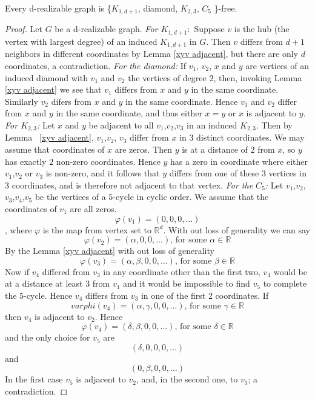 \documentclass[12pt,a4paper,titlepage,openany]{report}
\begin{document}
\begin{theorem}\label{d-realizable-free}
Every d-realizable graph is \{$K_{1,d+1}$, diamond,
$K_{2,3}$, $C_5$ \}-free.
\end{theorem} 
\begin{proof} Let $G$ be a d-realizable graph.\newline
\textit{For $K_{1,d+1}:$} Suppose $v$ is the hub (the vertex with largest degree) of an induced $K_{1,d+1}$ in $G$. Then $v$ differs from $d+1$ neighbors in different coordinates by Lemma \ref{xyv adjacent}, but there are only $d$ coordinates, a contradiction.\newline
\textit{For the diamond:} If $v_1$, $v_2$, $x$ and $y$ are vertices of an induced diamond with $v_1$ and $v_2$ the vertices of degree $2$, then, invoking Lemma \ref{xyv adjacent} we see that $v_1$ differs from $x$ and $y$ in the same coordinate. Similarly $v_2$ difers from $x$ and $y$ in the same coordinate. Hence $v_1$ and $v_2$ differ from $x$ and $y$ in the same coordinate, and thus either $x=y$ or $x$ is adjacent to $y$.\newline
\textit{For $K_{2,3}$:} Let $x$ and $y$ be adjacent to all $v_1$,$v_2$,$v_3$ in an induced $K_{2,3}$. Then by Lemma ~\ref{xyv adjacent}, $v_1$,$v_2$, $v_3$ differ from $x$ in $3$ distinct coordinates. We may assume that coordinates of $x$ are zeros. Then $y$ is at a distance of $2$ from $x$, so $y$ has exactly $2$ non-zero coordinates. Hence $y$ has a zero in coordinate where either $v_1$,$v_2$ or $v_3$ is non-zero, and it follows that $y$ differs from one of these $3$ vertices in $3$ coordinates, and is therefore not adjacent to that vertex.\newline
\textit{For the $C_5$:} Let $v_1$,$v_2$,$v_3$,$v_4$,$v_5$ be the vertices of a $5$-cycle in cyclic order. We assume that the coordinates of $v_1$ are all zeros.
$$\varphi (v_1)=(0,0,0,\ldots)$$, where $\varphi$ is the map from vertex set to $\mathbb{R}^d$.\newline
With out loss of generality we can say
$$\varphi (v_2)=(\alpha,0,0,\ldots) \text{, for some } \alpha \in \mathbb{R} $$
By the Lemma \ref{xyv adjacent} with out loss of generality
$$\varphi (v_3)=(\alpha,\beta,0,0,\ldots) \text{, for some } \beta \in \mathbb{R}$$
Now if $v_4$ differed from $v_3$ in any coordinate other than the first two, $v_4$ would be at a distance at least $3$ from $v_1$ and it would be impossible to find $v_5$ to complete the $5$-cycle. Hence $v_4$ differs from $v_3$ in one of the first 2 coordinates. If 
$$varphi (v_4)=(\alpha,\gamma,0,0,\ldots) \text{, for some } \gamma \in \mathbb{R}$$
then $v_4$ is adjacent to $v_2$. Hence
$$\varphi (v_4)=(\delta,\beta,0,0,\ldots) \text{, for some } \delta \in \mathbb{R}$$
and the only choice for $v_5$ are
$$(\delta,0,0,0,\ldots)$$
and 
$$(0,\beta,0,0,\ldots)$$
In the first case $v_5$ is adjacent to $v_2$, and, in the  second one, to $v_3$; a contradiction.
 
\end{proof}
\end{document}
